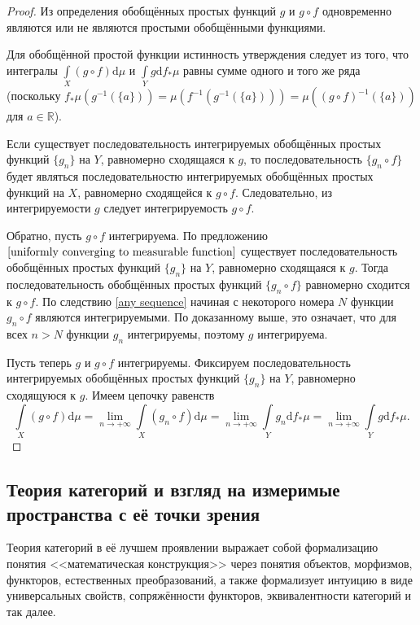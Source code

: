 \documentclass[12pt]{article}
\numberwithin{theorem}{section}
\theoremstyle{definition}
\newcommand{\RR}{\mathbb{R}}
\newcommand{\diff}{\mathrm{d}}
\begin{document}
	\begin{proof}
		Из определения обобщённых простых функций $ g $ и $ g \circ f $ одновременно являются или не являются простыми обобщёнными функциями.
		
		Для обобщённой простой функции истинность утверждения следует из того, что
		интегралы $ \int\limits_{X} (g \circ f)\diff\mu $ и $ \int\limits_{Y} g\diff f_*\mu $
		равны сумме одного и того же ряда 
		(поскольку $ f_*\mu(g^{-1}(\{a\})) = \mu(f^{-1}(g^{-1}(\{a\}))) = \mu((g \circ f)^{-1}(\{a\})) $
		для $ a \in \RR $).
		
		Если существует последовательность интегрируемых обобщённых простых функций $ \{g_n\} $ на $ Y $,
		равномерно сходящаяся к $ g $, 
		то последовательность $ \{g_n \circ f\} $ 
		будет являться последовательностю интегрируемых обобщённых простых функций на $ X $,
		равномерно сходящейся к $ g \circ f $.
		Следовательно, из интегрируемости $ g $ следует интегрируемость $ g \circ f $.
		
		Обратно, пусть $ g \circ f $ интегрируема. 
		По предложению $ \ref{uniformly converging to measurable function} $
		существует последовательность обобщённых простых функций $ \{g_n\} $ на $ Y $,
		равномерно сходящаяся к $ g $. 
		Тогда последовательность обобщённых простых функций $ \{g_n \circ f\} $ равномерно сходится к $ g \circ f $.
		По следствию \ref{any sequence} начиная с некоторого номера $ N $ функции $ g_n \circ f $ являются интегрируемыми.
		По доказанному выше, это означает, что для всех $ n > N $ функции $ g_n $ интегрируемы,
		поэтому $ g $ интегрируема.
		
		Пусть теперь $ g $ и $ g \circ f $ интегрируемы.
		Фиксируем последовательность интегрируемых обобщённых простых функций $ \{g_n\} $ на $ Y $,
		равномерно сходящуюся к $ g $.
		Имеем цепочку равенств
		$$ \int\limits_{X} (g \circ f)\diff\mu = \lim\limits_{n \to +\infty} \int\limits_{X} (g_n \circ f)\diff\mu
		= \lim\limits_{n \to +\infty} \int\limits_{Y} g_n \diff f_{*}\mu = \lim\limits_{n \to +\infty} \int\limits_{Y} g\diff f_{*}\mu. $$
	\end{proof}
	
	\subsection{Теория категорий и взгляд на измеримые пространства с её точки зрения}
	
	Теория категорий в её лучшем проявлении выражает собой формализацию понятия <<математическая конструкция>>
	через понятия объектов, морфизмов, функторов, естественных преобразований,
	а также формализует интуицию в виде универсальных свойств, сопряжённости функторов, эквивалентности категорий и так далее.
	
\end{document}
